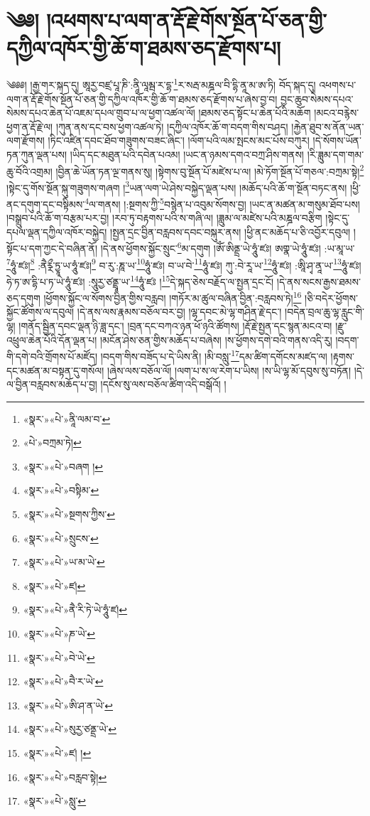 \chapter{༄༅། །འཕགས་པ་ལག་ན་རྡོ་རྗེ་གོས་སྔོན་པོ་ཅན་གྱི་དཀྱིལ་འཁོར་གྱི་ཆོ་ག་ཐམས་ཅད་རྫོགས་པ།}༄༅༅། །རྒྱ་གར་སྐད་དུ། ཨཱརྱ་བཛྲ་པཱ་ཎི་:ནཱི་ལཱམྦ་ར་དྷ་\footnote{«སྣར་»«པེ་»ནཱི་ལམ་བ་}ར་སརྦ་མཎྜལ་བི་དྷི་ནཱ་མ་ཨ་ཏི། བོད་སྐད་དུ། འཕགས་པ་ལག་ན་རྡོ་རྗེ་གོས་སྔོན་པོ་ཅན་གྱི་དཀྱིལ་འཁོར་གྱི་ཆོ་ག་ཐམས་ཅད་རྫོགས་པ་ཞེས་བྱ་བ། བྱང་ཆུབ་སེམས་དཔའ་སེམས་དཔའ་ཆེན་པོ་འཇམ་དཔལ་གྲུབ་པ་ལ་ཕྱག་འཚལ་ལོ། །ཐམས་ཅད་སྟོང་པ་ཆེན་པོའི་མཆོག །མངའ་བརྙེས་ཕྱག་ན་རྡོ་རྗེ་ལ། །ཀུན་ནས་དང་བས་ཕྱག་འཚལ་ཏེ། །དཀྱིལ་འཁོར་ཆོ་ག་བདག་གིས་བཤད། །རྐྱེན་ཐུབ་ས་ནོན་ཡན་ལག་རྫོགས། །ཏིང་འཛིན་དབང་ཐོབ་གཟུགས་བཟང་ཞིང་། །ལོག་པའི་ལམ་སྤངས་མང་པོས་བཀུར། །དེ་སོགས་ཡོན་ཏན་ཀུན་ལྡན་པས། །ཡིད་དང་མཐུན་པའི་དབེན་པའམ། །ཡང་ན་ཉམས་དགའ་བཀྲ་ཤིས་གནས། །རི་ཟླུམ་དག་གམ་ཆུ་བོའི་འགྲམ། །བྱིན་ཆེ་ཡོན་ཏན་ལྔ་གནས་སུ། །སྟེགས་བུ་སྔོན་པོ་མཛེས་པ་ལ། །མེ་ཏོག་སྔོན་པོ་གཅལ་:བཀྲམ་སྟེ།\footnote{«པེ་»བཀྲམ་ཏེ།} །སྟེང་དུ་གོས་སྔོན་སྐུ་གཟུགས་གཞག །\footnote{«སྣར་»«པེ་»བཞག །}ཡན་ལག་ཡེ་ཤེས་བསྐྱེད་ལྡན་པས། །མཆོད་པའི་ཆོ་ག་སྔོན་བཏང་ནས། །ཕྱི་ནང་དགུག་དང་བསྟིམས་\footnote{«སྣར་»«པེ་»བསྟིམ་}ལ་གནས། །:སྔགས་ཀྱི་\footnote{«སྣར་»«པེ་»སྔགས་ཀྱིས་}བསྙེན་པ་འབུམ་སོགས་བྱ། །ཡང་ན་མཚན་མ་གསུམ་ཐོབ་པས། །བསྒྲུབ་པའི་ཆོ་ག་བརྩམ་པར་བྱ། །རབ་ཏུ་བརྟགས་པའི་ས་གཞི་ལ། །ཟླུམ་ལ་མཛེས་པའི་མཎྜལ་བརྩིག །སྟེང་དུ་དཔལ་ལྡན་དཀྱིལ་འཁོར་བསྐྱེད། །སྤྱན་དྲང་བྱིན་བརླབས་དབང་བསྐུར་ནས། །ཕྱི་ནང་མཆོད་པ་ཅི་འབྱོར་དབུལ། །སྟོང་པ་དག་ཀྱང་དེ་བཞིན་ནོ། །དེ་ནས་ཕྱོགས་སྐྱོང་སྲུང་\footnote{«སྣར་»«པེ་»སྲུངས་}མ་དགུག །ཨོཾ་ཨིནྡྲ་ཡེ་ཧཱུཾ་ཛཿ། ཨགྣ་ཡེ་ཧཱུཾ་ཛཿ། :ཡ་མཱ་ཡ་\footnote{«སྣར་»«པེ་»ཡ་མ་ཡེ་}ཧཱུཾ་ཛཿ།\footnote{«སྣར་»«པེ་»ཛ།} :ནཻཪྼྀ་ཏྱཱ་ཡ་ཧཱུཾ་ཛཿ།\footnote{«སྣར་»«པེ་»ནཻ་རི་ཏེ་ཡེ་ཧཱུཾ་ཛ།} བ་རུ་:ཎཱ་ཡ་\footnote{«སྣར་»«པེ་»ཎ་ཡེ་}ཧཱུཾ་ཛཿ། བ་ཡ་བེ་\footnote{«སྣར་»«པེ་»བེ་ཡེ་}ཧཱུཾ་ཛཿ། ཀུ་:བེ་རཱ་ཡ་\footnote{«སྣར་»«པེ་»བཻ་ར་ཡེ་}ཧཱུཾ་ཛཿ། :ཨཱི་ཤྭ་ནཱ་ཡ་\footnote{«སྣར་»«པེ་»ཨི་ཤ་ན་ཡེ་}ཧཱུཾ་ཛཿ། ཧེ་ཏ་ཨ་དྷི་པ་ཏ་ཡེ་ཧཱུཾ་ཛཿ། :སཱུརྱ་ཙནྡྲཱ་ཡ་\footnote{«སྣར་»«པེ་»སུརྱ་ཙནྡྲ་ཡེ་}ཧཱུཾ་ཛཿ །\footnote{«སྣར་»«པེ་»ཛ། །}དེ་སྐད་ཅེས་བརྗོད་ལ་སྤྱན་དྲང་ངོ། །དེ་ནས་སངས་རྒྱས་ཐམས་ཅད་དགུག །ཕྱོགས་སྐྱོང་ལ་སོགས་བྱིན་གྱིས་བརླབ། །གཏོར་མ་ཚུལ་བཞིན་བྱིན་:བརླབས་ཏེ།\footnote{«སྣར་»«པེ་»བརླབ་སྟེ།} །ཅི་བདེར་ཕྱོགས་སྐྱོང་ཚོགས་ལ་དབུལ། །དེ་ནས་ལས་རྣམས་བཅོལ་བར་བྱ། །ལྷ་དབང་མེ་ལྷ་གཤིན་རྗེ་དང་། །བདེན་བྲལ་ཆུ་ལྷ་རླུང་གི་ལྷ། །གནོད་སྦྱིན་དབང་ལྡན་ཉི་ཟླ་དང་། །བྲན་དང་བཀའ་ཉན་ཕོ་ཉའི་ཚོགས། །རྡོ་རྗེ་སྤྱན་དང་སྙན་མངའ་བ། །རྫུ་འཕྲུལ་ཆེན་པོའི་དོན་ལྡན་པ། །མངོན་ཤེས་ཅན་གྱིས་མཆོད་པ་བཞེས། །ས་ཕྱོགས་དགེ་བའི་གནས་འདི་རུ། །བདག་གི་དགེ་བའི་གྲོགས་པོ་མཛོད། །བདག་གིས་བཟོད་པ་དེ་ཡིས་ནི། །མི་བསླུ་\footnote{«སྣར་»«པེ་»སླུ་}དམ་ཚིག་དགོངས་མཛད་ལ། །རྟགས་དང་མཚན་མ་བསྟན་དུ་གསོལ། །ཞེས་ལས་བཅོལ་ལོ། །ལག་པ་ས་ལ་རེག་པ་ཡིས། །ས་ཡི་ལྷ་མོ་དབུས་སུ་བཏོན། །དེ་ལ་བྱིན་བརླབས་མཆོད་པ་བྱ། །དངོས་སུ་ལས་བཅོལ་ཚིག་འདི་བསྒོའོ། །
